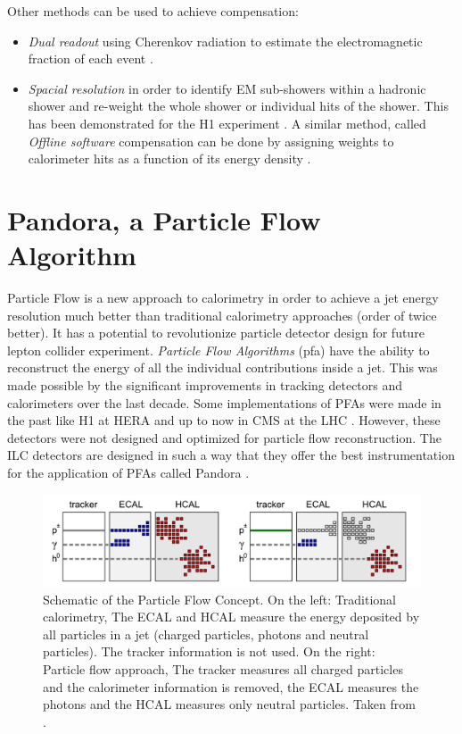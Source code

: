 Other methods can be used to achieve compensation:
\begin{itemize}
  \item \textit{Dual readout} using Cherenkov radiation to estimate the electromagnetic fraction of each event \cite{Akchurin:2013yaa}.
  \item \textit{Spacial resolution} in order to identify EM sub-showers within a hadronic shower and re-weight the whole shower or individual hits of the shower. This has been demonstrated for the H1 experiment \cite{Schacht:1990zw}. A similar method, called \textit{Offline software} compensation can be done by assigning weights to calorimeter hits as a function of its energy density \cite{SoftCompNew2012}.
\end{itemize}

\section{Pandora, a Particle Flow Algorithm}
\label{sec:PFA}

Particle Flow is a new approach to calorimetry in order to achieve a jet energy resolution much better than traditional calorimetry approaches (order of twice better). It has a potential to revolutionize particle detector design for future lepton collider experiment. \textit{Particle Flow Algorithms} (\acrshort{pfa}) have the ability to reconstruct the energy of all the individual contributions inside a jet. This was made possible by the significant improvements in tracking detectors and calorimeters over the last decade. Some implementations of PFAs were made in the past like H1 at HERA \cite{Abt:1994ye} and up to now in CMS at the LHC \cite{Sirunyan:2017ulk}. However, these detectors were not designed and optimized for particle flow reconstruction. The ILC detectors are designed in such a way that they offer the best
instrumentation for the application of PFAs called Pandora \cite{Marshall2013}.

\begin{figure}[htbp!]
  \centering
  \includegraphics[width=1\linewidth]{chap2/fig/PFAConcept.png}
  \caption{Schematic of the Particle Flow Concept. On the left: Traditional calorimetry, The ECAL and HCAL measure the energy deposited by all particles in a jet (charged particles, photons and neutral particles). The tracker information is not used. On the right: Particle flow approach, The tracker measures all charged particles and the calorimeter information is removed, the ECAL measures the photons and the HCAL measures only neutral particles. Taken from \cite{Feege:2011dsa}.} \label{fig:PFAConcept}
\end{figure}

